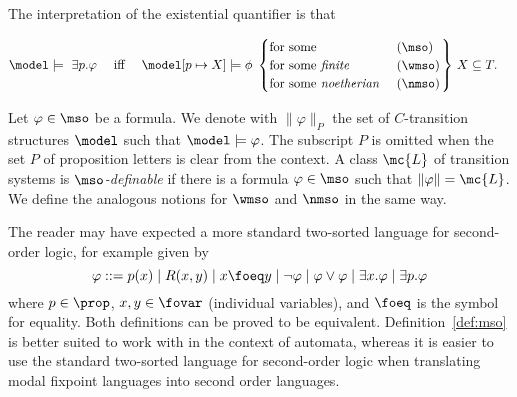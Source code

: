 The interpretation of the existential quantifier is that

\begin{align*}
\model \models\ \exists p. \varphi  & \quad\text{ iff }\quad  \model[p \mapsto X] \models \phi \,
\left.\begin{cases}
 \text{for some }   & {\bf (\mso)} \\
  \text{for some \emph{finite} }   & {\bf (\wmso)} \\
    \text{for some \emph{noetherian} }   & {\bf (\nmso)} 
 \end{cases}\right\}\,
 X \subseteq T.
\end{align*}

Let $\varphi\in \mso$ be a formula. We denote with $\|\varphi \|_P$ the set
of $C$-transition structures $\model$ such that $\model\models \varphi$.
The subscript $P$ is omitted when the set $P$ of proposition letters is clear
from the context.
A class $\mc{L}$ of transition systems is $\mso$\emph{-definable} if there
is a formula $\varphi \in \mso$ such that $\| \varphi \| = \mc{L}$.
We define the analogous notions for $\wmso$ and $\nmso$ in the same way.



\begin{remark}
The reader may have expected a more standard two-sorted language for second-order logic, for example given by
%
$$
\varphi ::= p(x)
\mid R(x,y)
\mid x \foeq y
\mid \neg \varphi
\mid \varphi \lor \varphi
\mid \exists x.\varphi
\mid \exists p.\varphi
$$%
where $p \in \prop$, $x,y \in \fovar$ (individual variables), %
and $\foeq$ is the symbol for equality.
Both definitions can be proved to be equivalent. Definition~\ref{def:mso} is better suited to work with in the context of automata, whereas it is easier to use the standard two-sorted language for second-order logic when translating modal fixpoint languages into second order languages.
\end{remark}

